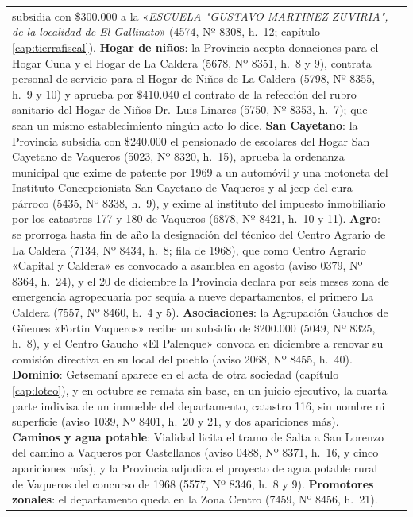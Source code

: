 \begin{longtable}{@{}p{2.7cm}p{10.3cm}@{}}
subsidia con \$300.000 a la «\textit{ESCUELA "GUSTAVO MARTINEZ ZUVIRIA", de la localidad de El Gallinato}» (4574, Nº 8308, h.\ 12; capítulo \ref{cap:tierrafiscal}). \textbf{Hogar de niños}: la Provincia acepta donaciones para el Hogar Cuna y el Hogar de La Caldera (5678, Nº 8351, h.\ 8 y 9), contrata personal de servicio para el Hogar de Niños de La Caldera (5798, Nº 8355, h.\ 9 y 10) y aprueba por \$410.040 el contrato de la refección del rubro sanitario del Hogar de Niños Dr.\ Luis Linares (5750, Nº 8353, h.\ 7); que sean un mismo establecimiento ningún acto lo dice. \textbf{San Cayetano}: la Provincia subsidia con \$240.000 el pensionado de escolares del Hogar San Cayetano de Vaqueros (5023, Nº 8320, h.\ 15), aprueba la ordenanza municipal que exime de patente por 1969 a un automóvil y una motoneta del Instituto Concepcionista San Cayetano de Vaqueros y al jeep del cura párroco (5435, Nº 8338, h.\ 9), y exime al instituto del impuesto inmobiliario por los catastros 177 y 180 de Vaqueros (6878, Nº 8421, h.\ 10 y 11). \textbf{Agro}: se prorroga hasta fin de año la designación del técnico del Centro Agrario de La Caldera (7134, Nº 8434, h.\ 8; fila de 1968), que como Centro Agrario «Capital y Caldera» es convocado a asamblea en agosto (aviso 0379, Nº 8364, h.\ 24), y el 20 de diciembre la Provincia declara por seis meses zona de emergencia agropecuaria por sequía a nueve departamentos, el primero La Caldera (7557, Nº 8460, h.\ 4 y 5). \textbf{Asociaciones}: la Agrupación Gauchos de Güemes «Fortín Vaqueros» recibe un subsidio de \$200.000 (5049, Nº 8325, h.\ 8), y el Centro Gaucho «El Palenque» convoca en diciembre a renovar su comisión directiva en su local del pueblo (aviso 2068, Nº 8455, h.\ 40). \textbf{Dominio}: Getsemaní aparece en el acta de otra sociedad (capítulo \ref{cap:loteo}), y en octubre se remata sin base, en un juicio ejecutivo, la cuarta parte indivisa de un inmueble del departamento, catastro 116, sin nombre ni superficie (aviso 1039, Nº 8401, h.\ 20 y 21, y dos apariciones más). \textbf{Caminos y agua potable}: Vialidad licita el tramo de Salta a San Lorenzo del camino a Vaqueros por Castellanos (aviso 0488, Nº 8371, h.\ 16, y cinco apariciones más), y la Provincia adjudica el proyecto de agua potable rural de Vaqueros del concurso de 1968 (5577, Nº 8346, h.\ 8 y 9). \textbf{Promotores zonales}: el departamento queda en la Zona Centro (7459, Nº 8456, h.\ 21). \\

\end{longtable}
